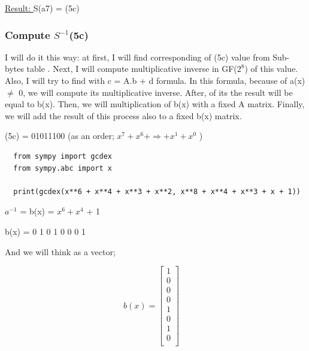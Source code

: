 \documentclass[11pt]{article}
\begin{document}
\underline{Result: }S(a7) = (5c)

\newpage
\subsubsection{Compute $S^{-1}$(5c)}

I will do it this way: at first, I will find corresponding of (5c) value from Sub-bytes table . Next, I will compute multiplicative inverse 
in GF($2^{8}$) of this value.\\

Also, I will try to find with c = A.b + d formula. In this formula, because of a(x) $\neq$ 0, we will compute its multiplicative inverse. After, 
of its the result  will be equal to b(x). Then, we will multiplication of b(x) with a fixed A matrix. Finally, we will add the result of 
this process also to a fixed  b(x) matrix.

\begin{center}
  (5c) = 01011100 (as an order; $x^{7}+x^{6}+ \Longrightarrow +x^{1}+x^{0}$ )
\end{center}

\lstset{language=Python}
\lstset{frame=lines}
\lstset{basicstyle=\footnotesize}
\begin{lstlisting}
  from sympy import gcdex
  from sympy.abc import x

  print(gcdex(x**6 + x**4 + x**3 + x**2, x**8 + x**4 + x**3 + x + 1))

\end{lstlisting}

\begin{center}
  $a^{-1}$ = b(x) = $x^{6} + x^{4}$ + 1
\end{center}

\begin{center}
  b(x) = 0 1 0 1 0 0 0 1 
\end{center}

And we will think as a vector;


\begin{center}
$$b (x) = 
\begin{bmatrix} 
 1\\
 0\\
 0\\
 0\\
 1\\
 0\\
 1\\
 0\\

\end{bmatrix}
\quad
$$
\end{center}
\end{document}
